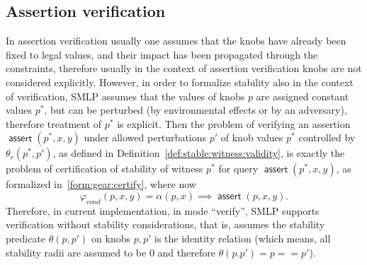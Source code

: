 \documentclass[a4paper,parskip=half]{article} %
\newcommand*\eqdef=
\newcommand*\assert{\operatorname{\mathsf{assert}}}
\begin{document}
\subsection{Assertion verification}


In assertion verification usually one assumes that the knobs have already been fixed to legal values, and their impact has been propagated 
through the constraints, therefore usually in the context of assertion verification knobs are not considered explicitly. However, in order 
to formalize stability also in the context of verification, SMLP assumes that the values of knobs $p$ are assigned constant values $p^*$, 
but can be perturbed (by environmental effects or by an adversary), therefore treatment of $p^*$ is explicit. Then the problem of 
verifying an assertion $\assert(p^*,x,y)$ under allowed perturbations $p'$ of knob values $p^*$ controlled by $\theta_r(p^*, p')$, 
as defined in Definition~\ref{def:stable:witness:validity}, is exactly the problem of certification of stability 
of witness $p^*$ for query $\assert(p^*,x,y)$, as formalized in~\cref{form:gear:certify}, 
where now  \[\varphi_{\mathit{cond}}(p,x,y) \eqdef \alpha(p,x) \implies \assert(p,x,y).\] Therefore, in current implementation, 
in mode ``verify'', SMLP supports verification without stability considerations, that is, assumes the stability predicate $\theta(p,p')$ on 
knobs $p,p'$ is the identity relation (which means, all stability radii are assumed to be $0$ and therefore $\theta(p.p') \eqdef p == p'$).
\end{document}
